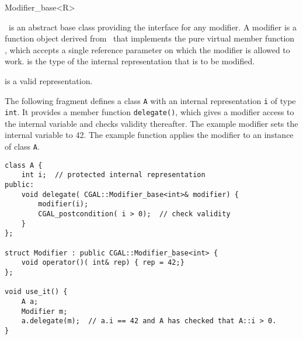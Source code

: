 \begin{ccClassTemplate}{Modifier_base<R>}
\label{sectionModifierBase}

\ccDefinition

\ccClassTemplateName\ is an abstract base class providing the
interface for any modifier. A modifier is a function object derived
from \ccClassTemplateName\ that implements the pure virtual member
function , which accepts a single reference parameter
 on which the modifier is allowed to work.   is the
type of the internal representation that is to be modified.


\ccTypes
{}
\ccThreeToTwo


\ccOperations
{}

\ccTagFullDeclarations
{}
    {\ccPostcond {} is a valid representation.}
\ccTagDefaults

\ccExample

The following fragment defines a class {\tt A} with an internal
representation {\tt i} of type {\tt int}. It provides a member
function {\tt delegate()}, which gives a modifier access to the
internal variable and checks validity thereafter.  The
example modifier sets the internal variable to 42. The example
function applies the modifier to an instance of class {\tt A}.

\begin{verbatim}
class A {
    int i;  // protected internal representation
public:
    void delegate( CGAL::Modifier_base<int>& modifier) {
        modifier(i);
        CGAL_postcondition( i > 0);  // check validity
    }
};

struct Modifier : public CGAL::Modifier_base<int> {
    void operator()( int& rep) { rep = 42;}
};

void use_it() {
    A a;
    Modifier m;
    a.delegate(m);  // a.i == 42 and A has checked that A::i > 0.
}
\end{verbatim}

\end{ccClassTemplate}




\ccParDims
\beforecprogskip\parskip
{}



